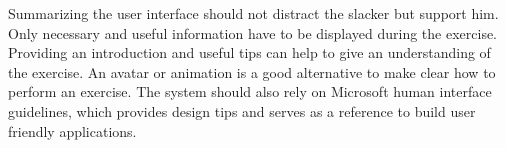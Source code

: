 Summarizing the user interface should not distract the slacker but support him. Only necessary and useful information have to be displayed during the exercise. Providing an introduction and useful tips can help to give an understanding of the exercise. An avatar or animation is a good alternative to make clear how to perform an exercise. The system should also rely on Microsoft human interface guidelines, which provides design tips and serves as a reference to build user friendly applications.

